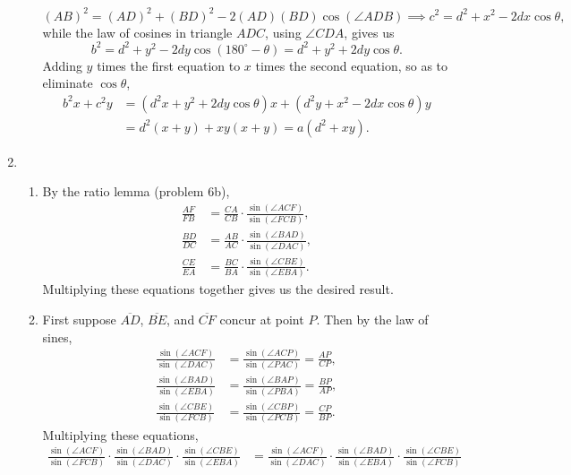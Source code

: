 \begin{enumerate}
\begin{enumerate}
\begin{equation*}
(AB)^2 = (AD)^2 + (BD)^2 - 2(AD)(BD)\cos(\angle ADB)\implies c^2 = d^2 + x^2 - 2dx\cos\theta,
\end{equation*}
while the law of cosines in triangle $ADC$, using $\angle CDA$, gives us
\begin{equation*}
b^2 = d^2 + y^2 - 2dy\cos(180^{\circ} - \theta) = d^2 + y^2 + 2dy\cos\theta.
\end{equation*}
Adding $y$ times the first equation to $x$ times the second equation, so as to eliminate $\cos\theta$,
\begin{align*}
b^2x + c^2y &= (d^2x + y^2 + 2dy\cos\theta)x + (d^2y + x^2 - 2dx\cos\theta)y \\
&= d^2(x + y) + xy(x + y) = a(d^2 + xy).
\end{align*}
\end{enumerate}
\item \begin{enumerate}
\item By the ratio lemma (problem 6b),
\begin{align*}
\frac{AF}{FB} &= \frac{CA}{CB}\cdot\frac{\sin(\angle ACF)}{\sin(\angle FCB)}, \\
\frac{BD}{DC} &= \frac{AB}{AC}\cdot\frac{\sin(\angle BAD)}{\sin(\angle DAC)}, \\
\frac{CE}{EA} &= \frac{BC}{BA}\cdot\frac{\sin(\angle CBE)}{\sin(\angle EBA)}.
\end{align*}
Multiplying these equations together gives us the desired result.
\item First suppose $\overline{AD}$, $\overline{BE}$, and $\overline{CF}$ concur at point $P$. Then by the law of sines,
\begin{align*}
\frac{\sin(\angle ACF)}{\sin(\angle DAC)} &= \frac{\sin(\angle ACP)}{\sin(\angle PAC)} = \frac{AP}{CP}, \\
\frac{\sin(\angle BAD)}{\sin(\angle EBA)} &= \frac{\sin(\angle BAP)}{\sin(\angle PBA)} = \frac{BP}{AP}, \\
\frac{\sin(\angle CBE)}{\sin(\angle FCB)} &= \frac{\sin(\angle CBP)}{\sin(\angle PCB)} = \frac{CP}{BP}.
\end{align*}
Multiplying these equations,
\begin{align*}
\frac{\sin(\angle ACF)}{\sin(\angle FCB)}\cdot\frac{\sin(\angle BAD)}{\sin(\angle DAC)}\cdot\frac{\sin(\angle CBE)}{\sin(\angle EBA)} &= \frac{\sin(\angle ACF)}{\sin(\angle DAC)}\cdot\frac{\sin(\angle BAD)}{\sin(\angle EBA)}\cdot\frac{\sin(\angle CBE)}{\sin(\angle FCB)} \\

\end{align*}
\end{enumerate}
\end{enumerate}
